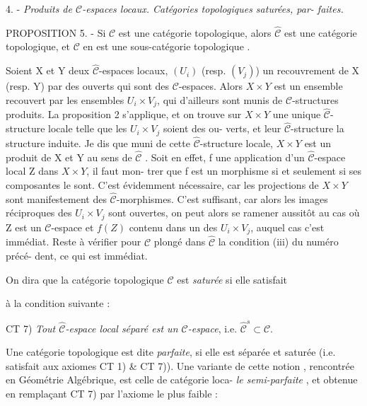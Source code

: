 4. - \emph{Produits de $\mathcal{C}$-espaces locaux. Catégories topologiques saturées, par-
faites.}

PROPOSITION 5. - Si $\mathcal{C}$ est une catégorie topologique, alors $\hat{\mathcal{C}}$ est une
catégorie topologique, et $\mathcal{C}$ en est une sous-catégorie topologique .

Soient X et Y deux $\hat{\mathcal{C}}$-espaces locaux, $(U_i)$ (resp. $(V_j)$) un recouvrement
de X (resp. Y) par des ouverts qui sont des $\mathcal{C}$-espaces. Alors $X \times Y$ est un
ensemble recouvert par les ensembles $U_i \times V_j$, qui d'ailleurs sont munis de
$\mathcal{C}$-structures produits. La proposition 2 s'applique, et on trouve sur
$X \times Y$ une unique $\hat{\mathcal{C}}$-structure locale telle que les $U_i \times V_j$ soient des ou-
verts, et leur $\hat{\mathcal{C}}$-structure la structure induite. Je dis que muni de cette
$\hat{\mathcal{C}}$-structure locale, $X \times Y$ est un produit de X et Y au sens de $\hat{\mathcal{C}}$ . Soit
en effet, f une application d'un $\hat{\mathcal{C}}$-espace local Z dans $X \times Y$, il faut mon-
trer que f est un morphisme si et seulement si ses composantes le sont.
C'est évidemment nécessaire, car les projections de $X \times Y$ sont manifestement
des $\hat{\mathcal{C}}$-morphismes. C'est suffisant, car alors les images réciproques des
$U_i \times V_j$ sont ouvertes, on peut alors se ramener aussitôt au cas où Z est
un $\mathcal{C}$-espace et $f(Z)$ contenu dans un des $U_i \times V_j$, auquel cas c'est immédiat.
Reste à vérifier pour $\mathcal{C}$ plongé dans $\hat{\mathcal{C}}$ la condition (iii) du numéro précé-
dent, ce qui est immédiat.

On dira que la catégorie topologique $\mathcal{C}$ est \emph{saturée} si elle satisfait

\newpage



à la condition suivante :

CT 7) \emph{Tout $\hat{\mathcal{C}}$-espace local séparé est un $\mathcal{C}$-espace}, i.e. $\hat{\mathcal{C}}^s \subset \mathcal{C}$.

Une catégorie topologique est dite \emph{parfaite}, si elle est séparée et
saturée (i.e. satisfait aux axiomes CT 1) \& CT 7)). Une variante de cette
notion , rencontrée en Géométrie Algébrique, est celle de catégorie loca-
\emph{le semi-parfaite} , et obtenue en remplaçant CT 7) par l'axiome le plus
faible :

